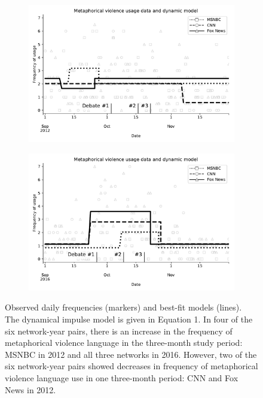 \begin{figure}[H]
  \vspace{.2in}
  \centering
  \begin{subfigure}{0.7\linewidth}
    \centering
    \includegraphics[width=\textwidth]{Figures/ModelFits-2012.pdf}
   \caption{}
    \label{fig:ModelFits-2012}
  \end{subfigure}
  \begin{subfigure}{0.7\linewidth}
    \centering
    \includegraphics[width=\textwidth]{Figures/ModelFits-2016.pdf}
   \caption{}
    \label{fig:ModelFits-2016}
  \end{subfigure}

  \caption{Observed daily frequencies (markers) and best-fit models (lines).
    The dynamical impulse model is given in 
    Equation 1. In four of the six network-year pairs, 
    there is an increase in the frequency of metaphorical violence language in the
    three-month study period: MSNBC in 2012 and all three networks in 2016. 
    However, two of the six network-year pairs showed decreases in frequency
    of metaphorical violence language use in one three-month period: CNN and Fox News
    in 2012. 
  } 
  \label{fig:ModelFits}
\end{figure}

